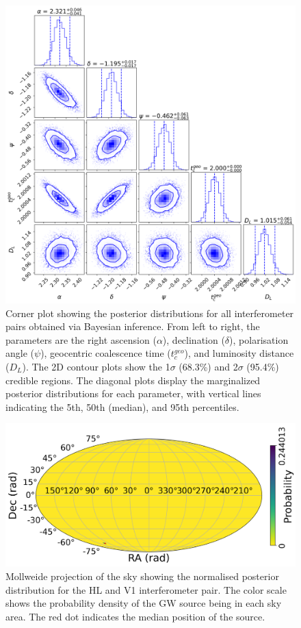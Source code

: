 \documentclass[11pt,a4paper]{article}
\begin{document}
\begin{figure}
    \includegraphics[width=\columnwidth, keepaspectratio]{../figures/corner_HLV.png}
    \caption{Corner plot showing the posterior distributions for all interferometer pairs obtained via Bayesian inference. From left to right, the parameters are the right ascension ($\alpha$), declination ($\delta$), polarisation angle ($\psi$), geocentric coalescence time ($t_c^{geo}$), and luminosity distance ($D_L$). The 2D contour plots show the 1$\sigma$ (68.3\%) and 2$\sigma$ (95.4\%) credible regions. The diagonal plots display the marginalized posterior distributions for each parameter, with vertical lines indicating the 5th, 50th (median), and 95th percentiles.}
    \label{fig:posterior_hlv}
\end{figure}

\begin{figure}
    \includegraphics[width=\columnwidth, keepaspectratio]{../figures/posterior_map_HLV.png}
    \caption{Mollweide projection of the sky showing the normalised posterior distribution for the HL and V1 interferometer pair. The color scale shows the probability density of the GW source being in each sky area. The red dot indicates the median position of the source.}
    \label{fig:sky_hlv}
\end{figure}
\end{document}

